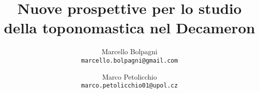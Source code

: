 \documentclass[11pt,a4paper]{article}
\begin{document}
\title{Nuove prospettive per lo studio della toponomastica nel Decameron}
\author{
  Marcello Bolpagni\\
  \texttt{marcello.bolpagni@gmail.com}
  \and
  Marco Petolicchio\\
  \texttt{marco.petolicchio01@upol.cz}
}\maketitle

\tableofcontents
\newpage


\printbibliography
\end{document}
